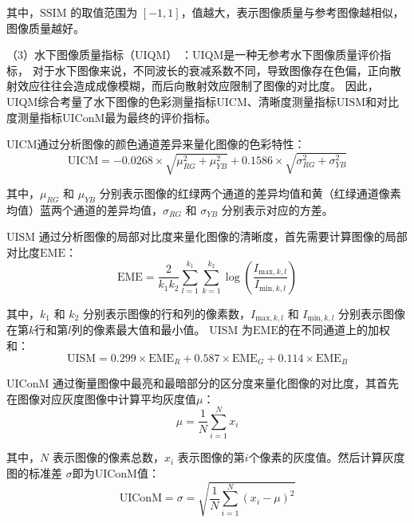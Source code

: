 其中，$\mathrm{SSIM}$ 的取值范围为 $[-1, 1]$，值越大，表示图像质量与参考图像越相似，图像质量越好。

（3）水下图像质量指标（UIQM） \cite{uiqm}：UIQM是一种无参考水下图像质量评价指标，
对于水下图像来说，不同波长的衰减系数不同，导致图像存在色偏，正向散射效应往往会造成成像模糊，而后向散射效应限制了图像的对比度。
因此，UIQM综合考量了水下图像的色彩测量指标$\mathrm{UICM}$、清晰度测量指标$\mathrm{UISM}$和对比度测量指标$\mathrm{UIConM}$最为最终的评价指标。

$\mathrm{UICM}$通过分析图像的颜色通道差异来量化图像的色彩特性：
\begin{equation}
    \mathrm{UICM}=-0.0268 \times \sqrt{\mu_{RG}^2 + \mu_{YB}^2} + 0.1586 \times \sqrt{\sigma_{RG}^2 + \sigma_{YB}^2}
\end{equation}

其中，$\mu_{RG}$ 和 $\mu_{YB}$ 分别表示图像的红绿两个通道的差异均值和黄（红绿通道像素均值）蓝两个通道的差异均值，$\sigma_{RG}$ 和 $\sigma_{YB}$ 分别表示对应的方差。

$\mathrm{UISM}$ 通过分析图像的局部对比度来量化图像的清晰度，首先需要计算图像的局部对比度$\mathrm{EME}$：
\begin{equation}
    \mathrm{EME} = \frac{2}{k_1 k_2} \sum_{l=1}^{k_1} \sum_{k=1}^{k_2} \log \left( \frac{I_{\text{max},k,l}}{I_{\text{min},k,l}} \right)
\end{equation}

其中，$k_1$ 和 $k_2$ 分别表示图像的行和列的像素数，$I_{\text{max},k,l}$ 和 $I_{\text{min},k,l}$ 分别表示图像在第$k$行和第$l$列的像素最大值和最小值。
$\mathrm{UISM}$ 为$\mathrm{EME}$的在不同通道上的加权和：
\begin{equation}
    \mathrm{UISM} = 0.299 \times \mathrm{EME}_{R} + 0.587 \times \mathrm{EME}_{G} + 0.114 \times \mathrm{EME}_{B}
\end{equation}

$\mathrm{UIConM}$ 通过衡量图像中最亮和最暗部分的区分度来量化图像的对比度，其首先在图像对应灰度图像中计算平均灰度值$\mu$：
\begin{equation}
   \mu = \frac{1}{N} \sum_{i=1}^{N} x_i
\end{equation}

其中，$N$ 表示图像的像素总数，$x_i$ 表示图像的第$i$个像素的灰度值。然后计算灰度图的标准差 \(\sigma\)即为UIConM值：
\begin{equation}
    \mathrm{UIConM}=\sigma = \sqrt{\frac{1}{N} \sum_{i=1}^{N} (x_i - \mu)^2} 
\end{equation}

